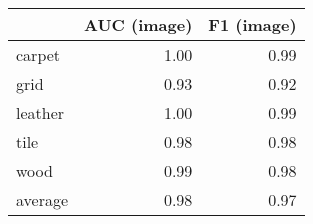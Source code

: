 \begin{tabular}{lrr}
\toprule
{} &  AUC (image) &  F1 (image) \\
\midrule
carpet  &         1.00 &        0.99 \\
grid    &         0.93 &        0.92 \\
leather &         1.00 &        0.99 \\
tile    &         0.98 &        0.98 \\
wood    &         0.99 &        0.98 \\
average &         0.98 &        0.97 \\
\bottomrule
\end{tabular}
